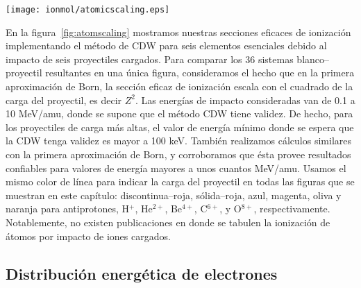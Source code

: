 \begin{figure*}[t!]
\centering
\texttt{[image: ionmol/atomicscaling.eps]}
\caption[Sección eficaz total de ionización reducida de átomos relevantes.]
{Sección eficaz total de ionización CDW reducida $\sigma_{\alpha}/Z^2$ 
de seis blancos atómicos relevantes. Las curvas se corresponden a los 
estados de carga de los seis proyectiles.}
\label{fig:atomscaling}
\end{figure*} 

En la figura~\ref{fig:atomscaling} mostramos nuestras secciones eficaces
de ionización implementando el método de CDW para seis elementos esenciales
debido al impacto de seis proyectiles cargados. Para comparar los 36
sistemas blanco--proyectil resultantes en una única figura, consideramos
el hecho que en la primera aproximación de Born, la sección eficaz de 
ionización escala con el cuadrado de la carga del proyectil, es decir
$Z^{2}$. Las energías de impacto consideradas van de 0.1 a 10 MeV/amu, 
donde se supone que el método CDW tiene validez. De hecho, para los
proyectiles de carga más altas, el valor de energía mínimo donde se 
espera que la CDW tenga validez es mayor a 100 keV. También realizamos
cálculos similares con la primera aproximación de Born, y corroboramos 
que ésta provee resultados confiables para valores de energía mayores
a unos cuantos MeV/amu. Usamos el mismo color de línea para indicar la
carga del proyectil en todas las figuras que se muestran en este 
capítulo: discontinua--roja, sólida--roja, azul, magenta, oliva y naranja
para antiprotones, H$^{+}$, He$^{2+}$, Be$^{4+}$, C$^{6+}$, y O$^{8+}$, 
respectivamente. Notablemente, no existen publicaciones en donde se
tabulen la ionización de átomos por impacto de iones cargados.

\subsection{Distribución energética de electrones}
\label{subsec:meanener}


